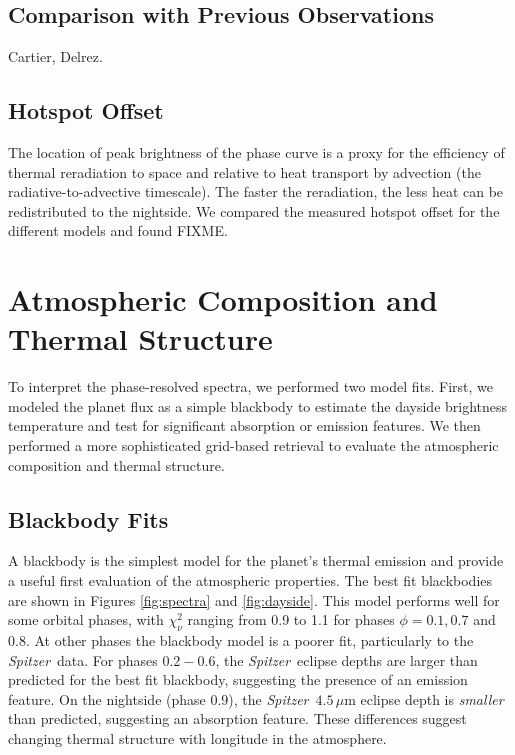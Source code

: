 \documentclass[twocolumn]{aastex61}
\newcommand{\project}[1]{\textsl{#1}}
\newcommand{\Spitzer}{\project{Spitzer}}
\begin{document}


\subsection{Comparison with Previous Observations}
Cartier, Delrez.

\subsection{Hotspot Offset}
The location of peak brightness of the phase curve is a proxy for the efficiency of thermal reradiation to space and relative to heat transport by advection (the radiative-to-advective timescale). The faster the reradiation, the less heat can be redistributed to the nightside. We compared the measured hotspot offset for the different models and found FIXME.



\section{Atmospheric Composition and Thermal Structure}
\label{sec:composition}
To interpret the phase-resolved spectra, we performed two model fits. First, we modeled the planet flux as a simple blackbody to estimate the dayside brightness temperature and test for significant absorption or emission features. We then performed a more sophisticated grid-based retrieval to evaluate the atmospheric composition and thermal structure. 

\subsection{Blackbody Fits}
A blackbody is the simplest model for the planet's thermal emission and provide a useful first evaluation of the atmospheric properties. The best fit blackbodies are shown in Figures \ref{fig:spectra} and \ref{fig:dayside}. This model performs well for some orbital phases, with $\chi^2_\nu$ ranging from 0.9 to 1.1 for phases $\phi = 0.1, 0.7$ and $0.8$. At other phases the blackbody model is a poorer fit, particularly to the \Spitzer\ data. For phases $0.2 - 0.6$, the \Spitzer\ eclipse depths are larger than predicted for the best fit blackbody, suggesting the presence of an emission feature. On the nightside (phase $0.9$), the \Spitzer\ $4.5\,\mu$m eclipse depth is \emph{smaller} than predicted, suggesting an absorption feature. These differences suggest changing thermal structure with longitude in the atmosphere.
\end{document}
